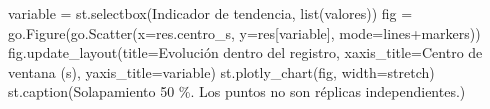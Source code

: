\documentclass[
  spanish,
  10.5pt,
  a4paper,
  DIV=11,
  numbers=noendperiod]{scrartcl}
\newenvironment{Shaded}{\begin{snugshade}}{\end{snugshade}}
\newcommand{\BuiltInTok}[1]{\textcolor[rgb]{0.00,0.23,0.31}{#1}}
\newcommand{\NormalTok}[1]{\textcolor[rgb]{0.00,0.23,0.31}{#1}}
\newcommand{\OperatorTok}[1]{\textcolor[rgb]{0.37,0.37,0.37}{#1}}
\newcommand{\StringTok}[1]{\textcolor[rgb]{0.13,0.47,0.30}{#1}}
\begin{document}
\begin{Shaded}
\begin{Highlighting}[]
\NormalTok{variable }\OperatorTok{=}\NormalTok{ st.selectbox(}\StringTok{\textquotesingle{}Indicador de tendencia\textquotesingle{}}\NormalTok{, }\BuiltInTok{list}\NormalTok{(valores))}
\NormalTok{fig }\OperatorTok{=}\NormalTok{ go.Figure(go.Scatter(x}\OperatorTok{=}\NormalTok{res.centro\_s, y}\OperatorTok{=}\NormalTok{res[variable],}
\NormalTok{                          mode}\OperatorTok{=}\StringTok{\textquotesingle{}lines+markers\textquotesingle{}}\NormalTok{))}
\NormalTok{fig.update\_layout(title}\OperatorTok{=}\StringTok{\textquotesingle{}Evolución dentro del registro\textquotesingle{}}\NormalTok{,}
\NormalTok{                  xaxis\_title}\OperatorTok{=}\StringTok{\textquotesingle{}Centro de ventana (s)\textquotesingle{}}\NormalTok{, yaxis\_title}\OperatorTok{=}\NormalTok{variable)}
\NormalTok{st.plotly\_chart(fig, width}\OperatorTok{=}\StringTok{\textquotesingle{}stretch\textquotesingle{}}\NormalTok{)}
\NormalTok{st.caption(}\StringTok{\textquotesingle{}Solapamiento 50 \%. Los puntos no son réplicas independientes.\textquotesingle{}}\NormalTok{)}


\end{Highlighting}
\end{Shaded}
\end{document}
